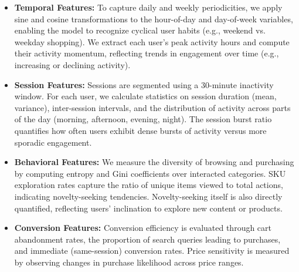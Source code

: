\documentclass[sigconf]{acmart}
\begin{document}
\begin{itemize}
  \item \textbf{Temporal Features:} 
  To capture daily and weekly periodicities, we apply sine and cosine transformations to the hour-of-day and day-of-week variables, enabling the model to recognize cyclical user habits (e.g., weekend vs. weekday shopping). We extract each user’s peak activity hours and compute their activity momentum, reflecting trends in engagement over time (e.g., increasing or declining activity).

  \item \textbf{Session Features:} 
  Sessions are segmented using a 30-minute inactivity window. For each user, we calculate statistics on session duration (mean, variance), inter-session intervals, and the distribution of activity across parts of the day (morning, afternoon, evening, night). The session burst ratio quantifies how often users exhibit dense bursts of activity versus more sporadic engagement.

  \item \textbf{Behavioral Features:}
  We measure the diversity of browsing and purchasing by computing entropy and Gini coefficients over interacted categories. SKU exploration rates capture the ratio of unique items viewed to total actions, indicating novelty-seeking tendencies. Novelty-seeking itself is also directly quantified, reflecting users’ inclination to explore new content or products.

  \item \textbf{Conversion Features:}
  Conversion efficiency is evaluated through cart abandonment rates, the proportion of search queries leading to purchases, and immediate (same-session) conversion rates. Price sensitivity is measured by observing changes in purchase likelihood across price ranges.


\end{itemize}
\end{document}
